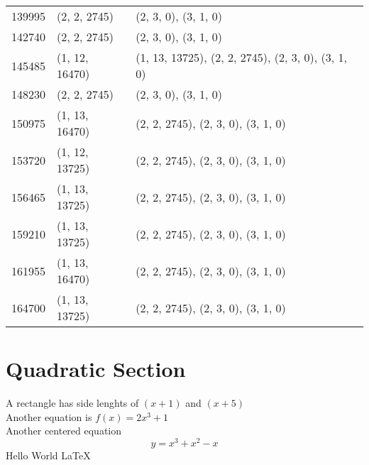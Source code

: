 \documentclass[a4paper, 12pt]{report}
\begin{document}
\begin{center}
\begin{longtable}{|l|l|l|}
139995 & (2, 2, 2745) & (2, 3, 0), (3, 1, 0) \\
142740 & (2, 2, 2745) & (2, 3, 0), (3, 1, 0) \\
145485 & (1, 12, 16470) & (1, 13, 13725), (2, 2, 2745), (2, 3, 0), (3, 1, 0) \\
148230 & (2, 2, 2745) & (2, 3, 0), (3, 1, 0) \\
150975 & (1, 13, 16470) & (2, 2, 2745), (2, 3, 0), (3, 1, 0) \\
153720 & (1, 12, 13725) & (2, 2, 2745), (2, 3, 0), (3, 1, 0) \\
156465 & (1, 13, 13725) & (2, 2, 2745), (2, 3, 0), (3, 1, 0) \\
159210 & (1, 13, 13725) & (2, 2, 2745), (2, 3, 0), (3, 1, 0) \\
161955 & (1, 13, 16470) & (2, 2, 2745), (2, 3, 0), (3, 1, 0) \\
164700 & (1, 13, 13725) & (2, 2, 2745), (2, 3, 0), (3, 1, 0) \\
\end{longtable}
\end{center}
  	  	
	\section{Quadratic Section}
		A rectangle has side lenghts of $(x+1)$ and $(x+5)$ \\
		Another equation is $f(x)=2x^3+1$ \\
		Another centered equation $$y=x^3+x^2-x$$
		Hello World \LaTeX\		
\end{document}
